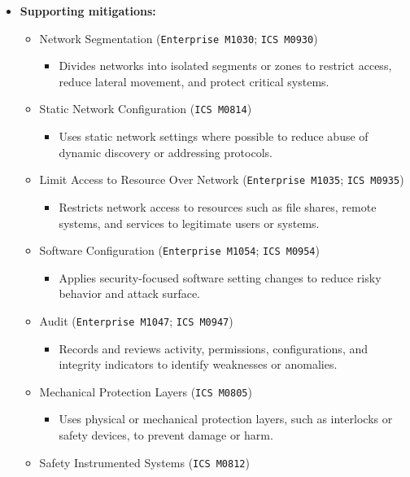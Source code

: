 \documentclass[10pt,a4paper,oneside]{report}
\begin{document}
\begin{itemize}
\item \textbf{Supporting mitigations:}
\begin{itemize}
\item Network Segmentation (\texttt{Enterprise M1030}; \texttt{ICS M0930})
\begin{itemize}
\item Divides networks into isolated segments or zones to restrict access, reduce lateral movement, and protect critical systems.
\end{itemize}
\item Static Network Configuration (\texttt{ICS M0814})
\begin{itemize}
\item Uses static network settings where possible to reduce abuse of dynamic discovery or addressing protocols.
\end{itemize}
\item Limit Access to Resource Over Network (\texttt{Enterprise M1035}; \texttt{ICS M0935})
\begin{itemize}
\item Restricts network access to resources such as file shares, remote systems, and services to legitimate users or systems.
\end{itemize}
\item Software Configuration (\texttt{Enterprise M1054}; \texttt{ICS M0954})
\begin{itemize}
\item Applies security-focused software setting changes to reduce risky behavior and attack surface.
\end{itemize}
\item Audit (\texttt{Enterprise M1047}; \texttt{ICS M0947})
\begin{itemize}
\item Records and reviews activity, permissions, configurations, and integrity indicators to identify weaknesses or anomalies.
\end{itemize}
\item Mechanical Protection Layers (\texttt{ICS M0805})
\begin{itemize}
\item Uses physical or mechanical protection layers, such as interlocks or safety devices, to prevent damage or harm.
\end{itemize}
\item Safety Instrumented Systems (\texttt{ICS M0812})
\begin{itemize}

\end{itemize}
\end{itemize}
\end{itemize}
\end{document}
